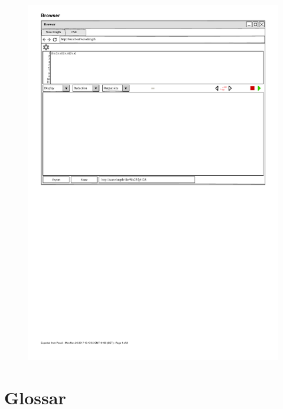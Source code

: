 \documentclass[parskip=full,11pt,twoside]{scrartcl}
\begin{document}
\begin{figure}[H]
	\centering
	\includegraphics{img/share}
\end{figure}

\section{Glossar}

\glsaddall
\printglossaries
\end{document}
